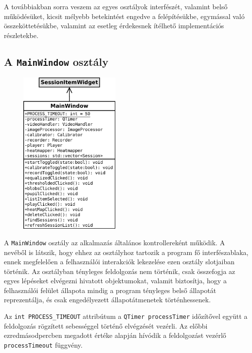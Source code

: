A továbbiakban sorra veszem az egyes osztályok interfészét, valamint belső működésüket, kicsit mélyebb betekintést engedve a felépítésükbe, egymással való összeköttetésükbe, valamint az esetleg érdekesnek ítélhető implementációs részletekbe.

\subsection{A \texttt{MainWindow} osztály}\label{sect:mainwindow}

\begin{figure}[!ht]
\centering
\includegraphics[width=50mm, keepaspectratio]{figures/class_mainwindow.png}
\end{figure}

A \texttt{MainWindow} osztály az alkalmazás általános kontrollereként működik. A nevéből is látszik, hogy ehhez az osztályhoz tartozik a program fő interfészablaka, ennek megfelelően a felhasználói interakciók lekezelése ezen osztály slotjaiban történik. Az osztályban tényleges feldolgozás nem történik, csak összefogja az egyes lépéseket elvégezni hivatott objektumokat, valamit biztosítja, hogy a felhasználói felület állapota mindig a program tényleges belső állapotát reprezentálja, és csak engedélyezett állapotátmenetek történhessenek.

\bigskip

Az \texttt{int PROCESS\_TIMEOUT} attribútum a \texttt{QTimer processTimer} időzítővel együtt a feldolgozás rögzített sebességgel történő elvégzését vezérli. Az előbbi ezredmásodpercben megadott értéke alapján hívódik a feldolgozást vezérlő \texttt{processTimeout} függvény.

